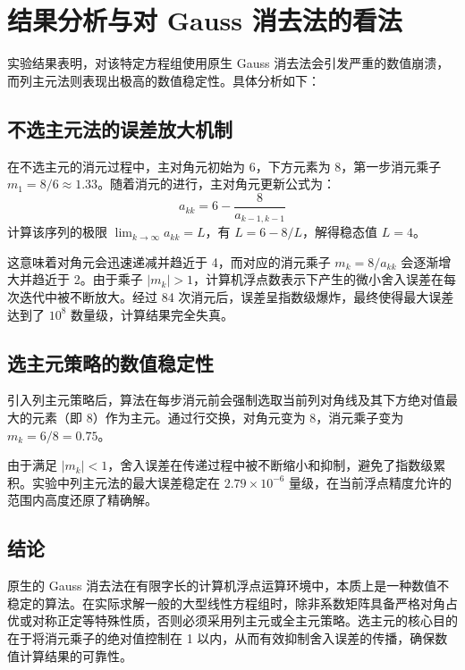 \documentclass[a4paper,11pt]{article}
\begin{document}
\section{结果分析与对 Gauss 消去法的看法}
实验结果表明，对该特定方程组使用原生 Gauss 消去法会引发严重的数值崩溃，而列主元法则表现出极高的数值稳定性。具体分析如下：

\subsection{不选主元法的误差放大机制}
在不选主元的消元过程中，主对角元初始为 6，下方元素为 8，第一步消元乘子 $m_1 = 8/6 \approx 1.33$。随着消元的进行，主对角元更新公式为：
\begin{equation}
a_{kk} = 6 - \frac{8}{a_{k-1, k-1}}
\end{equation}
计算该序列的极限 $\lim_{k \to \infty} a_{kk} = L$，有 $L = 6 - 8/L$，解得稳态值 $L = 4$。

这意味着对角元会迅速递减并趋近于 4，而对应的消元乘子 $m_k = 8/a_{kk}$ 会逐渐增大并趋近于 2。由于乘子 $|m_k| > 1$，计算机浮点数表示下产生的微小舍入误差在每次迭代中被不断放大。经过 84 次消元后，误差呈指数级爆炸，最终使得最大误差达到了 $10^8$ 数量级，计算结果完全失真。

\subsection{选主元策略的数值稳定性}
引入列主元策略后，算法在每步消元前会强制选取当前列对角线及其下方绝对值最大的元素（即 8）作为主元。通过行交换，对角元变为 8，消元乘子变为 $m_k = 6/8 = 0.75$。

由于满足 $|m_k| < 1$，舍入误差在传递过程中被不断缩小和抑制，避免了指数级累积。实验中列主元法的最大误差稳定在 $2.79 \times 10^{-6}$ 量级，在当前浮点精度允许的范围内高度还原了精确解。

\subsection{结论}
原生的 Gauss 消去法在有限字长的计算机浮点运算环境中，本质上是一种数值不稳定的算法。在实际求解一般的大型线性方程组时，除非系数矩阵具备严格对角占优或对称正定等特殊性质，否则必须采用列主元或全主元策略。选主元的核心目的在于将消元乘子的绝对值控制在 1 以内，从而有效抑制舍入误差的传播，确保数值计算结果的可靠性。
\end{document}
